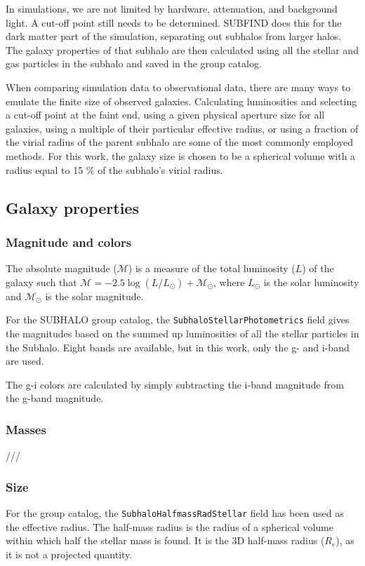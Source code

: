 In simulations, we are not limited by hardware, attenuation, and background light. A cut-off point still needs to be determined. SUBFIND does this for the dark matter part of the simulation, separating out subhalos from larger halos. The galaxy properties of that subhalo are then calculated using all the stellar and gas particles in the subhalo and saved in the group catalog. 


When comparing simulation data to observational data, there are many ways to emulate the finite size of observed galaxies. Calculating luminosities and selecting a cut-off point at the faint end, using a given physical aperture size for all galaxies, using a multiple of their particular effective radius, or using a fraction of the virial radius of the parent subhalo are some of the most commonly employed methods. For this work, the galaxy size is chosen to be a spherical volume with a radius equal to 15 \% of the subhalo's virial radius.

\subsection{Galaxy properties}

\subsubsection{Magnitude and colors}

The absolute magnitude ($\mathcal{M}$) is a measure of the total luminosity ($L$) of the galaxy such that $\mathcal{M} = -2.5 \log(L/L_\odot) + \mathcal{M}_\odot$, where $L_\odot$ is the solar luminosity and $\mathcal{M}_\odot$ is the solar magnitude.

For the SUBHALO group catalog, the \texttt{SubhaloStellarPhotometrics} field gives the magnitudes based on the summed up luminosities of all the stellar particles in the Subhalo. Eight bands are available, but in this work, only the g- and i-band are used.

The g-i colors are calculated by simply subtracting the i-band magnitude from the g-band magnitude.

\subsubsection{Masses}

///

\subsubsection{Size}
For the group catalog, the \texttt{SubhaloHalfmassRadStellar} field has been used as the effective radius. The half-mass radius is the radius of a spherical volume within which half the stellar mass is found. It is the 3D half-mass radius ($R_e$), as it is not a projected quantity.

